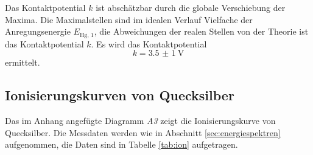 Das Kontaktpotential $k$ ist abschätzbar durch die globale Verschiebung der Maxima.
Die Maximalstellen sind im idealen Verlauf Vielfache der Anregungsenergie $E_\text{Hg, 1}$, 
die Abweichungen der realen Stellen von der Theorie ist das Kontaktpotential $k$.
Es wird das Kontaktpotential
\begin{equation}
	k=\SI{3.5(10)}{\volt}
	\label{qu:k2}
\end{equation}
ermittelt.


\subsection{Ionisierungskurven von Quecksilber} %
\label{sec:ion}
Das im Anhang angefügte Diagramm \emph{A3} zeigt die Ionisierungskurve von Quecksilber.
Die Messdaten werden wie in Abschnitt \ref{sec:energiespektren} aufgenommen, 
die Daten sind in Tabelle \ref{tab:ion} aufgetragen.

